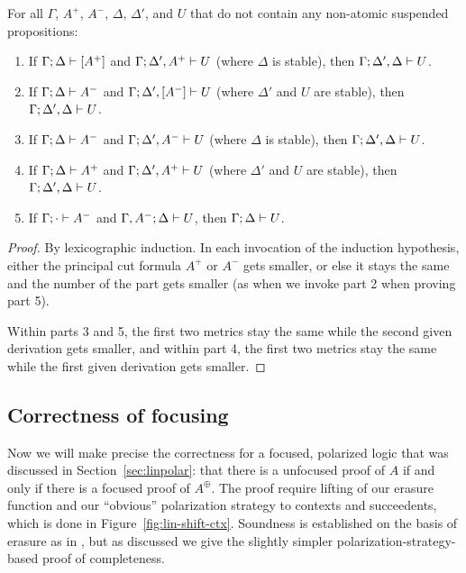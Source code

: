 \bigskip
\begin{theorem}\label{thm:lincut}
For all $\Gamma$, $A^+$, $A^-$, $\Delta$, $\Delta'$, and $U$ that
do not contain any non-atomic suspended propositions:
\begin{enumerate}
\item If ${\Gamma};{\Delta} \vdash {[A^+]} \mathstrut$
      and ${\Gamma};{\Delta',A^+} \vdash {U} \mathstrut$
      (where $\Delta$ is stable), 
      then ${\Gamma};{\Delta',\Delta} \vdash {U} \mathstrut$.
\item If ${\Gamma};{\Delta} \vdash {A^-} \mathstrut$
      and ${\Gamma};{\Delta', [A^-]} \vdash {U} \mathstrut$
      (where $\Delta'$ and $U$ are stable),
      then ${\Gamma};{\Delta',\Delta} \vdash {U} \mathstrut$. 
\item If ${\Gamma};{\Delta} \vdash {A^-} \mathstrut$
      and ${\Gamma};{\Delta', A^-} \vdash {U} \mathstrut$
      (where $\Delta$ is stable), 
      then ${\Gamma};{\Delta',\Delta} \vdash {U} \mathstrut$. 
\item If ${\Gamma};{\Delta} \vdash {A^+} \mathstrut$
      and ${\Gamma};{\Delta', A^+} \vdash {U} \mathstrut$
      (where $\Delta'$ and $U$ are stable),
      then ${\Gamma};{\Delta',\Delta} \vdash {U} \mathstrut$. 
\item If ${\Gamma};{\cdot} \vdash {A^-} \mathstrut$
      and ${\Gamma, A^-};{\Delta} \vdash {U} \mathstrut$,
      then ${\Gamma};{\Delta} \vdash {U} \mathstrut$. 
\end{enumerate}
\end{theorem}

\begin{proof}
By lexicographic induction. In each invocation of the induction
hypothesis, either the principal cut formula $A^+$ or $A^-$ gets 
smaller, or else it stays the same and the number of the part
gets smaller (as when we invoke part 2 when proving part 5). 

Within parts 3 and 5, the first two metrics stay the same while the
second given derivation gets smaller, and within part 4, the first two
metrics stay the same while the first given derivation gets smaller.
\end{proof}

\subsection{Correctness of focusing}



Now we will make precise the correctness for a focused, polarized logic
that was discussed in Section~\ref{sec:linpolar}: that there is a unfocused
proof of $A$ if and only if there is a focused proof of $A^\oplus$. The
proof require lifting of our erasure function and our ``obvious'' 
polarization strategy to contexts and succeedents, which is done
in Figure~\ref{fig:lin-shift-ctx}. Soundness is established on the 
basis of erasure as in \cite{simmons11structural}, but as discussed
we give the slightly simpler polarization-strategy-based proof of
completeness.


